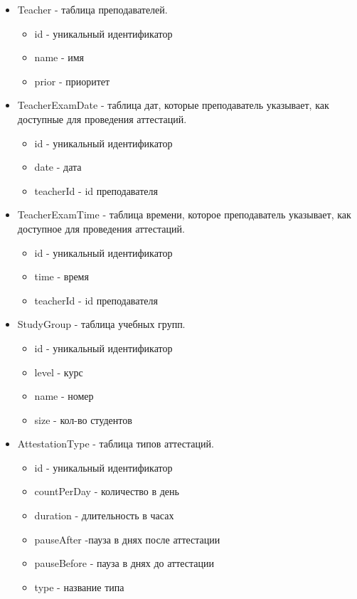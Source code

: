 \begin{itemize}
	\item Teacher - таблица преподавателей.
	\begin{itemize}
		\item id - уникальный идентификатор
		\item name - имя
		\item prior - приоритет
	\end{itemize} 
	
	\item TeacherExamDate - таблица дат, которые преподаватель указывает, как доступные для проведения аттестаций. 
	\begin{itemize}
		\item id - уникальный идентификатор
		\item date - дата
		\item teacherId - id преподавателя
	\end{itemize} 
	
	\item TeacherExamTime - таблица времени, которое преподаватель указывает, как доступное для проведения аттестаций.
	\begin{itemize}
		\item id - уникальный идентификатор
		\item time - время
		\item teacherId - id преподавателя
	\end{itemize} 
	
	\item StudyGroup - таблица учебных групп.
	\begin{itemize}
		\item id - уникальный идентификатор
		\item level - курс
		\item name - номер
		\item size - кол-во студентов
	\end{itemize} 
	
	\item AttestationType - таблица типов аттестаций.
	\begin{itemize}
		\item id - уникальный идентификатор
		\item countPerDay - количество в день
		\item duration - длительность в часах
		\item pauseAfter -пауза в днях после аттестации
		\item pauseBefore - пауза в днях до аттестации
		\item type - название типа
	\end{itemize} 
	

\end{itemize}
